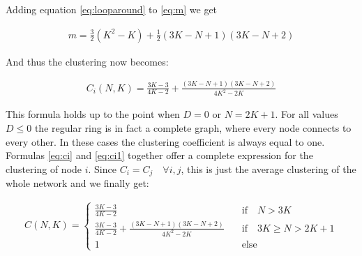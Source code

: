 \begin{apendicesenv}
Adding equation \ref{eq:looparound} to \ref{eq:m} we get

\begin{align}
    m = \frac{3}{2}(K^2 - K) + \frac{1}{2}(3K-N+1)(3K-N+2)
\end{align}

And thus the clustering now becomes:

\begin{align}
    C_i(N,K) = \frac{3K-3}{4K-2} + \frac{(3K-N+1)(3K-N+2)}{4K^2-2K}
    \label{eq:ci1}
\end{align}

This formula holds up to the point when $D=0$ or $N=2K+1$. For all values $D\leq 0$ the regular ring is in fact a complete graph, where
every node connects to every other. In these cases the clustering coefficient is always equal to one.  Formulas \ref{eq:ci} and
\ref{eq:ci1} together offer a complete expression for the clustering of node $i$. Since $C_i=C_j \quad \forall i,j$, this is just the
average clustering of the whole network and we finally get:

\begin{align}
    C(N,K) =
    \begin{cases}
        \frac{3K-3}{4K-2} \quad &\text{if} \quad N>3K \\[9pt]
        \frac{3K-3}{4K-2} + \frac{(3K-N+1)(3K-N+2)}{4K^2-2K} \quad &\text{if}
        \quad 3K \geq N > 2K+1 \\[9pt]
        1 \quad &\text{else}
    \end{cases}
    \label{eq:ci2}
\end{align}


\end{apendicesenv}


%
%
%
%
%

